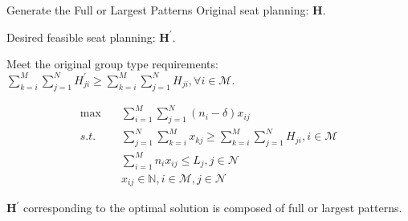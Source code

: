   \begin{frame}{Generate the Full or Largest Patterns}
    \small
    Original seat planning: $\bm{H}$.

    Desired feasible seat planning: $\bm{H}^{\prime}$.
    
    Meet the original group type requirements: $\sum_{k=i}^{M} \sum_{j=1}^{N} H^{'}_{ji} \geq \sum_{k=i}^{M} \sum_{j=1}^{N} H_{ji}, \forall i \in \mathcal{M}$.

    \begin{equation}\label{improve_seat}
      \begin{aligned}
      \max \quad & \sum_{i=1}^{M} \sum_{j=1}^{N} (n_i-\delta)  x_{ij} \\
      s.t. \quad & \sum_{j=1}^{N} \sum_{k=i}^{M} x_{kj} \geq  \sum_{k=i}^{M} \sum_{j=1}^{N} H_{ji}, i \in \mathcal{M} \\
      & \sum_{i=1}^{M} n_{i} x_{ij} \leq L_{j}, j \in \mathcal{N} \\
      & x_{ij} \in \mathbb{N}, i \in \mathcal{M}, j \in \mathcal{N}
      \end{aligned}
    \end{equation}

    $\bm{H}^{\prime}$ corresponding to the optimal solution is composed of full or largest patterns.
  \end{frame}

  